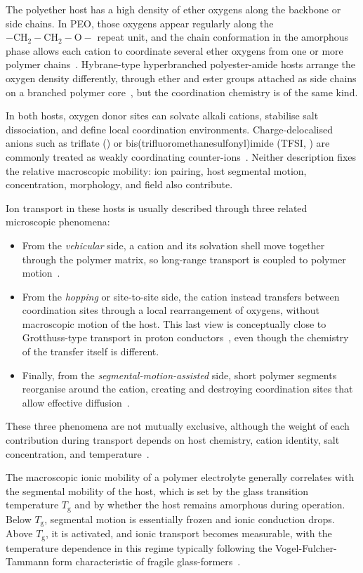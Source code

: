 \documentclass[12pt, twoside]{report}
\begin{document}
The polyether host has a high density of ether oxygens along the backbone or side chains. In PEO, those oxygens appear regularly along the \(-\!\mathrm{CH}_2\!-\!\mathrm{CH}_2\!-\!\mathrm{O}\!-\) repeat unit, and the chain conformation in the amorphous phase allows each cation to coordinate several ether oxygens from one or more polymer chains~\cite{Berthier1983, Lightfoot1993}. Hybrane-type hyperbranched polyester-amide hosts arrange the oxygen density differently, through ether and ester groups attached as side chains on a branched polymer core~\cite{Froehling2004}, but the coordination chemistry is of the same kind.

In both hosts, oxygen donor sites can solvate alkali cations, stabilise salt dissociation, and define local coordination environments. Charge-delocalised anions such as triflate () or bis(trifluoro\-methane\-sulfonyl)imide (TFSI, ) are commonly treated as weakly coordinating counter-ions~\cite{BruceVincent1993}. Neither description fixes the relative macroscopic mobility: ion pairing, host segmental motion, concentration, morphology, and field also contribute.

Ion transport in these hosts is usually described through three related microscopic phenomena:
\begin{itemize}
  \item From the \emph{vehicular} side, a cation and its solvation shell move together through the polymer matrix, so long-range transport is coupled to polymer motion~\cite{Kreuer1982}.
  \item From the \emph{hopping} or site-to-site side, the cation instead transfers between coordination sites through a local rearrangement of oxygens, without macroscopic motion of the host. This last view is conceptually close to Grotthuss-type transport in proton conductors~\cite{Agmon1995}, even though the chemistry of the transfer itself is different.
  \item Finally, from the \emph{segmental-motion-assisted} side, short polymer segments reorganise around the cation, creating and destroying coordination sites that allow effective diffusion~\cite{Druger1983, RatnerShriver1988}.
\end{itemize}
These three phenomena are not mutually exclusive, although the weight of each contribution during transport depends on host chemistry, cation identity, salt concentration, and temperature~\cite{Berthier1983, Gray1991}.

The macroscopic ionic mobility of a polymer electrolyte generally correlates with the segmental mobility of the host, which is set by the glass transition temperature \(T_{\mathrm{g}}\) and by whether the host remains amorphous during operation. Below \(T_{\mathrm{g}}\), segmental motion is essentially frozen and ionic conduction drops. Above \(T_{\mathrm{g}}\), it is activated, and ionic transport becomes measurable, with the temperature dependence in this regime typically following the Vogel-Fulcher-Tammann form characteristic of fragile glass-formers~\cite{Gray1991, Angell1991}.
\end{document}
